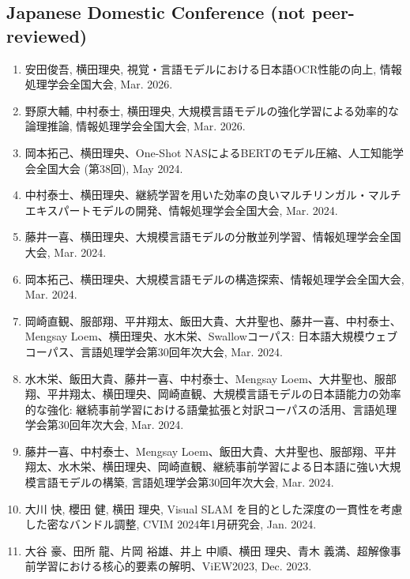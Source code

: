 \documentclass[margin,line]{cv}
\begin{document}
\begin{resume}
\section{\sc Japanese Domestic Conference (not peer-reviewed)}
\begin{enumerate}
\item 安田俊吾, 横田理央, 視覚・言語モデルにおける日本語OCR性能の向上, 情報処理学会全国大会, Mar. 2026.

\item 野原大輔, 中村泰士, 横田理央, 大規模言語モデルの強化学習による効率的な論理推論, 情報処理学会全国大会, Mar. 2026.

\item 岡本拓己、横田理央、One-Shot NASによるBERTのモデル圧縮、人工知能学会全国大会 (第38回), May 2024.

\item 中村泰士、横田理央、継続学習を用いた効率の良いマルチリンガル・マルチエキスパートモデルの開発、情報処理学会全国大会, Mar. 2024.

\item 藤井一喜、横田理央、大規模言語モデルの分散並列学習、情報処理学会全国大会, Mar. 2024.

\item 岡本拓己、横田理央、大規模言語モデルの構造探索、情報処理学会全国大会, Mar. 2024.

\item 岡崎直観、服部翔、平井翔太、飯田大貴、大井聖也、藤井一喜、中村泰士、Mengsay Loem、横田理央、水木栄、Swallowコーパス: 日本語大規模ウェブコーパス、言語処理学会第30回年次大会, Mar. 2024.

\item 水木栄、飯田大貴、藤井一喜、中村泰士、Mengsay Loem、大井聖也、服部翔、平井翔太、横田理央、岡崎直観、大規模言語モデルの日本語能力の効率的な強化: 継続事前学習における語彙拡張と対訳コーパスの活用、言語処理学会第30回年次大会, Mar. 2024.

\item 藤井一喜、中村泰士、Mengsay Loem、飯田大貴、大井聖也、服部翔、平井翔太、水木栄、横田理央、岡崎直観、継続事前学習による日本語に強い大規模言語モデルの構築, 言語処理学会第30回年次大会, Mar. 2024.

\item 大川 快, 櫻田 健, 横田 理央, Visual SLAM を目的とした深度の一貫性を考慮した密なバンドル調整, CVIM 2024年1月研究会, Jan. 2024.

\item 大谷 豪、田所 龍、片岡 裕雄、井上 中順、横田 理央、青木 義満、超解像事前学習における核心的要素の解明、ViEW2023, Dec. 2023.


\end{enumerate}
\end{resume}
\end{document}
